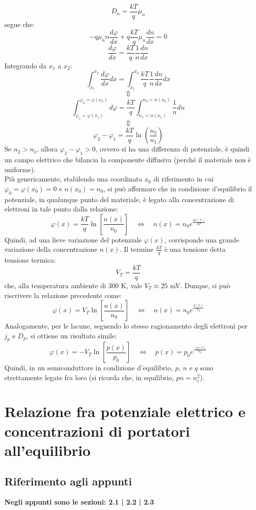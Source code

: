 \documentclass{article}
\numberwithin{equation}{subsection}
\begin{document}
	$$D_n = \frac{kT}{q} \mu_n$$
	segue che:
	$$-q\mu_n n \frac{d\varphi}{dx} + q \frac{kT}{q} \mu_n \frac{dn}{dx} = 0$$
	$$\frac{d\varphi}{dx} = \frac{kT}{q} \frac{1}{n} \frac{dn}{dx}$$
	Integrando da $x_1$ a $x_2$:
	$$\int_{x_1}^{x_2} \frac{d\varphi}{dx} dx = \int_{x_1}^{x_2} \frac{kT}{q} \frac{1}{n} \frac{dn}{dx} dx$$
	$$\Updownarrow$$
	$$\int_{\varphi_1 = \varphi(x_1)}^{\varphi_2 = \varphi(x_2)} d\varphi = \frac{kT}{q} \int_{n_1 = n(x_1)}^{n_2 = n(x_2)} \frac{1}{n} dn$$
	$$\Updownarrow$$
	$$\varphi_2 - \varphi_1 = \frac{kT}{q} \ln \left( \frac{n_2}{n_1} \right)$$
	Se $n_2 > n_1$, allora $\varphi_2 - \varphi_1 > 0$, ovvero si ha una differenza di potenziale, è quindi un campo elettrico che bilancia la componente diffusiva (perché il materiale non è uniforme).\\
	Più genericamente, stabilendo una coordinata $x_0$ di riferimento in cui $\varphi_0 = \varphi(x_0) = 0$ e $n(x_0) = n_0$, si può affermare che in condizione d'equilibrio il potenziale, in qualunque punto del materiale, è legato alla concentrazione di elettroni in tale punto dalla relazione:
	$$\varphi(x) = \frac{kT}{q} \ln \left[ \frac{n(x)}{n_0} \right] \quad \Leftrightarrow \quad n(x) = n_0 e^{\frac{q\varphi(x)}{kT}}$$
	Quindi, ad una lieve variazione del potenziale $\varphi(x)$, corrisponde una grande variazione della concentrazione $n(x)$. Il termine $\frac{kT}{q}$ è una tensione detta tensione termica:
	$$V_T = \frac{kT}{q}$$
	che, alla temperatura ambiente di 300 K, vale $V_T \approx 25$ mV.
	Dunque, si può riscrivere la relazione precedente come:
	$$\varphi(x) = V_T \ln \left[ \frac{n(x)}{n_0} \right] \quad \Leftrightarrow \quad n(x) = n_0 e^{\frac{q(x)}{V_T}}$$
	Analogamente, per le lacune, seguendo lo stesso ragionamento degli elettroni per $j_p$ e $D_p$, si ottiene un risultato simile:
	$$\varphi(x) = -V_T \ln \left[ \frac{p(x)}{p_0} \right] \quad \Leftrightarrow \quad p(x) = p_0 e^{\frac{-q(x)}{V_T}}$$
	Quindi, in un semiconduttore in condizione d'equilibrio, $p$, $n$ e $q$ sono strettamente legate fra loro (si ricorda che, in equilibrio, $pn = n_i^2$).
	\section{Relazione fra potenziale elettrico e concentrazioni di portatori all'equilibrio}
	\subsection{Riferimento agli appunti}
	\textbf{Negli appunti sono le sezioni: 2.1 | 2.2 | 2.3}
\end{document}
